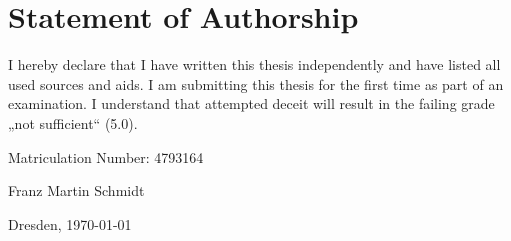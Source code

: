 \documentclass[preview]{standalone}
\begin{document}
	\clearpage
	\thispagestyle{empty}
	\section*{Statement of Authorship}
	\noindent
	I hereby declare that I have written this thesis independently and have listed all used sources and aids. I am submitting this thesis for the first time as part of an examination. I understand that attempted deceit will result in the failing grade „not sufficient“ (5.0). \par
	\vspace{4em}
	\noindent
	Matriculation Number: 4793164 \par
	\vspace{8em}
	\noindent
	Franz Martin Schmidt \par
	\noindent
	Dresden, \today
\end{document}
